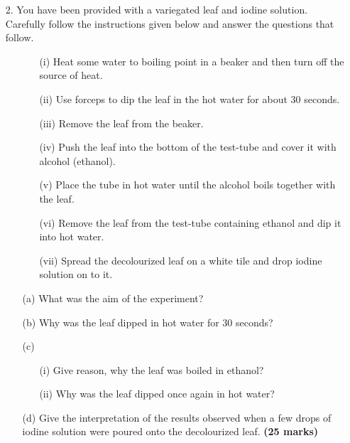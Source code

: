 \begin{enumerate}
\item[2.] You have been provided with a variegated leaf and iodine solution. Carefully follow the instructions given below and answer the questions that follow.
\begin{enumerate}
\item[]
\begin{enumerate}
\item[(i)] Heat some water to boiling point in a beaker and then turn off the source of heat.
\item[(ii)] Use forceps to dip the leaf in the hot water for about 30 seconds.
\item[(iii)] Remove the leaf from the beaker.
\item[(iv)] Push the leaf into the bottom of the test-tube and cover it with alcohol (ethanol).
\item[(v)] Place the tube in hot water until the alcohol boils together with the leaf.
\item[(vi)] Remove the leaf from the test-tube containing ethanol and dip it into hot water.
\item[(vii)] Spread the decolourized leaf on a white tile and drop iodine solution on to it.
\end{enumerate}
\item[(a)] What was the aim of the experiment?
\item[(b)] Why was the leaf dipped in hot water for 30 seconds?
\item[(c)]
\begin{enumerate}
\item[(i)] Give reason, why the leaf was boiled in ethanol?
\item[(ii)] Why was the leaf dipped once again in hot water?
\end{enumerate}
\item[(d)] Give the interpretation of the results observed when a few drops of iodine solution were poured onto the decolourized leaf.
\flushright \textbf{(25 marks)}
\end{enumerate}

\end{enumerate}